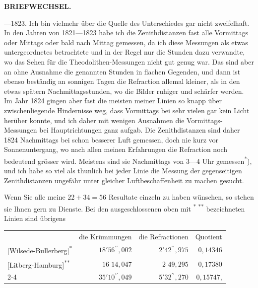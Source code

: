 \par\clearpage
\noindent{}\hfill{\small\textbf{BRIEFWECHSEL.}}\hfill\null\par\medskip
{}---1823. Ich bin vielmehr über die Quelle des Unterschiedes gar nicht
zweifelhaft. In den Jahren von 1821---1823 habe ich die Zenithdistanzen fast
alle Vormittags oder Mittags oder bald nach Mittag gemessen, da ich diese Messungen als etwas untergeordnetes betrachtete und in der Regel nur die Stunden
dazu verwandte, wo das Sehen für die Theodolithen-Messungen nicht gut
genug war. Das sind aber an  ohne Ausnahme die genannten Stunden in flachen Gegenden, und dann ist ebenso beständig an
sonnigen Tagen die Refraction allemal kleiner, als in den etwas spätern Nachmittagsstunden, wo die Bilder ruhiger und schärfer werden. Im Jahr 1824
gingen aber fast die meisten meiner Linien so knapp über zwischenliegende
Hindernisse weg, dass Vormittags bei sehr vielen gar kein Licht herüber
konnte, und ich daher mit wenigen Ausnahmen die Vormittags-Messungen bei
Hauptrichtungen ganz aufgab. Die Zenithdistanzen sind daher 1824  Nachmittags bei schon besserer Luft gemessen, doch nie kurz vor Sonnenuntergang, wo nach allen meinen Erfahrungen die Refraction noch bedeutend
grösser wird. Meistens sind sie Nachmittags von 3---4 Uhr gemessen\textsuperscript{*}), und
ich habe so viel als thunlich bei jeder Linie die Messung der gegenseitigen
Zenithdistanzen ungefähr unter gleicher Luftbeschaffenheit zu machen gesucht.
\par\noindent\hspace*{\parindent}Wenn Sie alle meine \(22+34=56\) Resultate einzeln zu haben wünschen,
so stehen sie Ihnen gern zu Dienste. Bei den ausgeschlossenen oben mit \textsuperscript{* **}
bezeichneten Linien sind übrigens
\begin{center}
\setlength{\tabcolsep}{4pt}
\begin{tabular}{lrrr}
& die Krümmungen & die Refractionen & Quotient\\
{}[Wilsede-Bullerberg]\textsuperscript{*} &\(18'56^{\prime\prime}{,}002\)&\(2'42^{\prime\prime}{,}975\)&\(0{,}14346\)\\
{}[Litberg-Hamburg]\textsuperscript{**} &\(16\phantom{' }14{,}047\)&\(2\phantom{' }49{,}295\)&\(0{,}17380\)\\\cline{2-4}
\multicolumn{1}{r}{Summa}&\(35'10^{\prime\prime}{,}049\)&\(5'32^{\prime\prime}{,}270\)&\(0{,}15747\),
\end{tabular}
\end{center}
